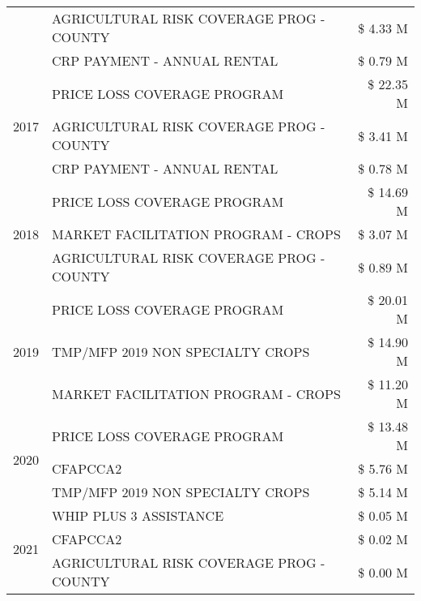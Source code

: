 \begin{tabular}{llr}
 & AGRICULTURAL RISK COVERAGE PROG - COUNTY      & \$ 4.33 M \\
 & CRP PAYMENT - ANNUAL RENTAL                   & \$ 0.79 M \\
\cline{1-3}
\multirow[t]{3}{*}{2017} & PRICE LOSS COVERAGE PROGRAM & \$ 22.35 M \\
 & AGRICULTURAL RISK COVERAGE PROG - COUNTY & \$ 3.41 M \\
 & CRP PAYMENT - ANNUAL RENTAL & \$ 0.78 M \\
\cline{1-3}
\multirow[t]{3}{*}{2018} & PRICE LOSS COVERAGE PROGRAM & \$ 14.69 M \\
 & MARKET FACILITATION PROGRAM - CROPS & \$ 3.07 M \\
 & AGRICULTURAL RISK COVERAGE PROG - COUNTY & \$ 0.89 M \\
\cline{1-3}
\multirow[t]{3}{*}{2019} & PRICE LOSS COVERAGE PROGRAM & \$ 20.01 M \\
 & TMP/MFP 2019 NON SPECIALTY CROPS & \$ 14.90 M \\
 & MARKET FACILITATION PROGRAM - CROPS & \$ 11.20 M \\
\cline{1-3}
\multirow[t]{3}{*}{2020} & PRICE LOSS COVERAGE PROGRAM & \$ 13.48 M \\
 & CFAPCCA2 & \$ 5.76 M \\
 & TMP/MFP 2019 NON SPECIALTY CROPS & \$ 5.14 M \\
\cline{1-3}
\multirow[t]{3}{*}{2021} & WHIP PLUS 3 ASSISTANCE & \$ 0.05 M \\
 & CFAPCCA2 & \$ 0.02 M \\
 & AGRICULTURAL RISK COVERAGE PROG - COUNTY & \$ 0.00 M \\
\cline{1-3}
\bottomrule
\end{tabular}
